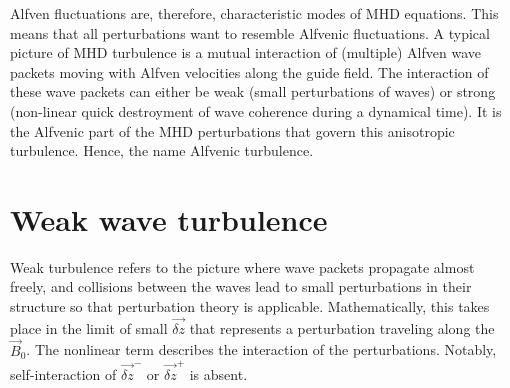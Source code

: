 \documentclass[usenatbib,twocolumn, twocolappendix]{aastex63}
\begin{document}
%


Alfven fluctuations are, therefore, characteristic modes of MHD equations.
This means that all perturbations want to resemble Alfvenic fluctuations.
A typical picture of MHD turbulence is a mutual interaction of (multiple) Alfven wave packets moving with Alfven velocities along the guide field.
The interaction of these wave packets can either be weak (small perturbations of waves) or strong (non-linear quick destroyment of wave coherence during a dynamical time).
It is the Alfvenic part of the MHD perturbations that govern this anisotropic turbulence. 
Hence, the name Alfvenic turbulence.



\section{Weak wave turbulence}

Weak turbulence refers to the picture where wave packets propagate almost freely, and collisions between the waves lead to small perturbations in their structure so that perturbation theory is applicable.
Mathematically, this takes place in the limit of small $\vec{\delta z}$ that represents a perturbation traveling along the $\vec{B}_0$.
The nonlinear term describes the interaction of the perturbations.
Notably, self-interaction of $\vec{\delta z}^-$ or $\vec{\delta z}^+$ is absent.
\end{document}
